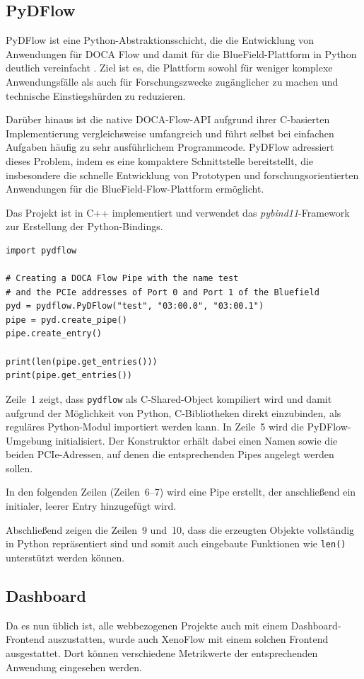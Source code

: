 \documentclass[paper=a4, fontsize=11pt]{scrartcl} %
\numberwithin{equation}{section} %
\numberwithin{figure}{section} %
\numberwithin{table}{section} %
\begin{document}
\subsection{PyDFlow}
PyDFlow ist eine Python-Abstraktionsschicht, die die Entwicklung von Anwendungen für DOCA Flow und damit für die BlueField-Plattform in Python deutlich vereinfacht \cite{heimbrodt2025pydflow}. Ziel ist es, die Plattform sowohl für weniger komplexe Anwendungsfälle als auch für Forschungszwecke zugänglicher zu machen und technische Einstiegshürden zu reduzieren.

Darüber hinaus ist die native DOCA-Flow-API aufgrund ihrer C-basierten Implementierung vergleichsweise umfangreich und führt selbst bei einfachen Aufgaben häufig zu sehr ausführlichem Programmcode. PyDFlow adressiert dieses Problem, indem es eine kompaktere Schnittstelle bereitstellt, die insbesondere die schnelle Entwicklung von Prototypen und forschungsorientierten Anwendungen für die BlueField-Flow-Plattform ermöglicht.

Das Projekt ist in C++ implementiert und verwendet das \textit{pybind11}-Framework \cite{jakob2015pybind11} zur Erstellung der Python-Bindings.
\begin{verbatim}
import pydflow

# Creating a DOCA Flow Pipe with the name test 
# and the PCIe addresses of Port 0 and Port 1 of the Bluefield
pyd = pydflow.PyDFlow("test", "03:00.0", "03:00.1")
pipe = pyd.create_pipe()
pipe.create_entry()

print(len(pipe.get_entries()))
print(pipe.get_entries())
\end{verbatim}
Zeile~1 zeigt, dass \texttt{pydflow} als C-Shared-Object kompiliert wird und damit aufgrund der Möglichkeit von Python, C-Bibliotheken direkt einzubinden, als reguläres Python-Modul importiert werden kann. In Zeile~5 wird die PyDFlow-Umgebung initialisiert. Der Konstruktor erhält dabei einen Namen sowie die beiden PCIe-Adressen, auf denen die entsprechenden Pipes angelegt werden sollen.

In den folgenden Zeilen (Zeilen~6--7) wird eine Pipe erstellt, der anschließend ein initialer, leerer Entry hinzugefügt wird.

Abschließend zeigen die Zeilen~9 und~10, dass die erzeugten Objekte vollständig in Python repräsentiert sind und somit auch eingebaute Funktionen wie \texttt{len()} unterstützt werden können.
\subsection{Dashboard}
Da es nun üblich ist, alle webbezogenen Projekte auch mit einem Dashboard-Frontend auszustatten, wurde auch XenoFlow mit einem solchen Frontend ausgestattet. Dort können verschiedene Metrikwerte der entsprechenden Anwendung eingesehen werden.
\end{document}
